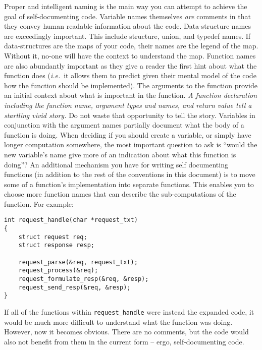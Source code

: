\documentclass[11pt,onecolumn]{article}
\def\ie{\textit{i.e.}}
\newcommand{\head}[1]{\vspace{0.4em}\noindent{\bf #1}}
\begin{document}
\head{Toward writing self-documenting code.}  Proper and intelligent
naming is the main way you can attempt to achieve the goal of
self-documenting code.  Variable names themselves {\em are} comments
in that they convey human readable information about the code.
Data-structure names are exceedingly important.  This include
structure, union, and typedef names.  If data-structures are the maps
of your code, their names are the legend of the map.  Without it,
no-one will have the context to understand the map.  Function names
are also abundantly important as they give a reader the first hint
about what the function does (\ie\ it allows them to predict given
their mental model of the code how the function should be
implemented).  The arguments to the function provide an initial
context about what is important in the function.  {\em A function
  declaration including the function name, argument types and names,
  and return value tell a startling vivid story.}  Do not waste that
opportunity to tell the story.  Variables in conjunction with the
argument names partially document what the body of a function is
doing.  When deciding if you should create a variable, or simply have
longer computation somewhere, the most important question to ask is
``would the new variable's name give more of an indication about what
this function is doing''?  An additional mechanism you have for
writing self documenting functions (in addition to the rest of the
conventions in this document) is to move some of a function's
implementation into separate functions.  This enables you to choose
more function names that can describe the sub-computations of the
function.  For example:

    \begin{minipage}{3in}
      \footnotesize
      \lstset{language=C}
      \begin{lstlisting}
int request_handle(char *request_txt)
{
    struct request req;
    struct response resp;

    request_parse(&req, request_txt);
    request_process(&req);
    request_formulate_resp(&req, &resp);
    request_send_resp(&req, &resp);
}
      \end{lstlisting}
    \end{minipage}

If all of the functions within {\tt request\_handle} were instead the
expanded code, it would be much more difficult to understand what the
function was doing.  However, now it becomes obvious.  There are no
comments, but the code would also not benefit from them in the current
form -- ergo, self-documenting code.
\end{document}
